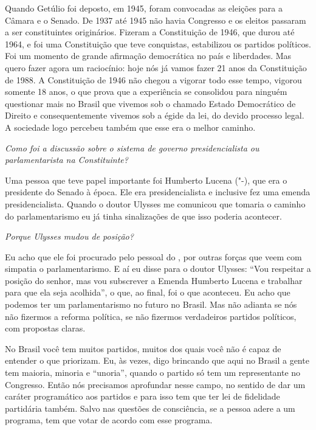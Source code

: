 Quando Getúlio foi deposto, em 1945, foram convocadas as eleições para a
Câmara e o Senado. De 1937 até 1945 não havia Congresso e os eleitos
passaram a ser constituintes originários. Fizeram a Constituição de
1946, que durou até 1964, e foi uma Constituição que teve conquistas,
estabilizou os partidos políticos. Foi um momento de grande afirmação
democrática no país e liberdades. Mas quero fazer agora um raciocínio:
hoje nós já vamos fazer 21 anos da Constituição de 1988. A Constituição
de 1946 não chegou a vigorar todo esse tempo, vigorou somente 18 anos, o
que prova que a experiência se consolidou para ninguém questionar mais
no Brasil que vivemos sob o chamado Estado Democrático de Direito e
consequentemente vivemos sob a égide da lei, do devido processo legal. A
sociedade logo percebeu também que esse era o melhor caminho.

\medskip

\emph{Como foi a discussão sobre o sistema de governo presidencialista
ou parlamentarista na Constituinte?}

Uma pessoa que teve papel importante foi Humberto
Lucena ("-), que era o presidente do Senado à época. Ele era
presidencialista e inclusive fez uma emenda presidencialista. Quando o
doutor Ulysses me comunicou que tomaria o caminho do parlamentarismo eu
já tinha sinalizações de que isso poderia acontecer.

\medskip

\emph{Porque Ulysses mudou de posição?}

Eu acho que ele foi procurado pelo pessoal do , por
outras forças que veem com simpatia o parlamentarismo. E aí eu disse
para o doutor Ulysses: ``Vou respeitar a posição do senhor, mas vou
subscrever a Emenda Humberto Lucena e trabalhar para que ela seja
acolhida'', o que, ao final, foi o que aconteceu. Eu acho que podemos
ter um parlamentarismo no futuro no Brasil. Mas não adianta se nós não
fizermos a reforma política, se não fizermos verdadeiros partidos
políticos, com propostas claras.

No Brasil você tem muitos partidos, muitos dos quais você não é capaz de
entender o que priorizam. Eu, às vezes, digo brincando que aqui no
Brasil a gente tem maioria, minoria e ``unoria'', quando o partido só
tem um representante no Congresso. Então nós precisamos aprofundar nesse
campo, no sentido de dar um caráter programático aos partidos e para
isso tem que ter lei de fidelidade partidária também. Salvo nas questões
de consciência, se a pessoa adere a um programa, tem que votar de acordo
com esse programa.

